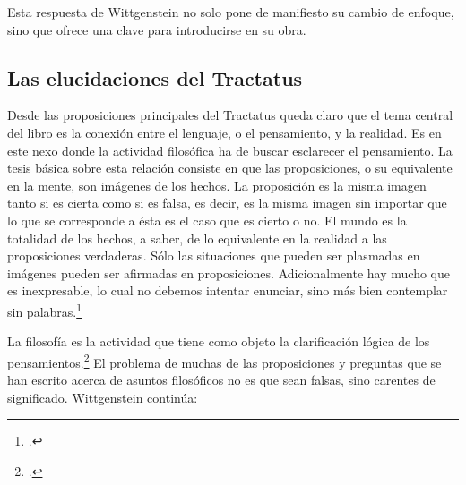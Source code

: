 Esta respuesta de Wittgenstein no solo pone de manifiesto su cambio de enfoque,
sino que ofrece una clave para introducirse en su obra. 

\subsection{Las elucidaciones del Tractatus}
Desde las proposiciones principales del Tractatus queda claro que el tema
central del libro es la conexión entre el lenguaje, o el pensamiento, y la
realidad.  
Es en este nexo donde la actividad filosófica ha de buscar esclarecer el
pensamiento.
La tesis básica sobre esta relación consiste en que las proposiciones, o su
equivalente en la mente, son imágenes de los hechos.
La proposición es la misma imagen tanto si es cierta como si es falsa, es decir,
es la misma imagen sin importar que lo que se corresponde a ésta es el caso que
es cierto o no. El mundo es la totalidad de los hechos, a saber, de lo
equivalente en la realidad a las proposiciones verdaderas.
Sólo las situaciones que pueden ser plasmadas en imágenes pueden ser afirmadas
en proposiciones. Adicionalmente hay mucho que es inexpresable, lo cual no
debemos intentar enunciar, sino más bien contemplar sin palabras.\footcite[cf.
p.19]{IWT}


La filosofía es la actividad que tiene como objeto la clarificación lógica
de los pensamientos.\footcite[4.112 p. 52]{tractatus} El problema de muchas de
las proposiciones y preguntas que se han escrito acerca de asuntos filosóficos
no es que sean falsas, sino carentes de significado. Wittgenstein continúa: 

